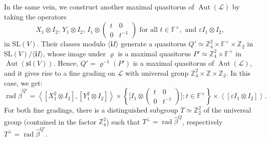 \documentclass[a4paper,reqno]{amsart}
\theoremstyle{definition}
\numberwithin{theorem}{section}
\numberwithin{equation}{section}
\begin{document}
In the same vein, we construct another maximal quasitorus of $\operatorname{\mathrm{Aut}}({\mathcal{L}})$ by taking the operators
\begin{equation*} 
X_1\otimes I_2,\, Y_1\otimes I_2,\, 
I_1\otimes \left(\begin{smallmatrix} t&0\\ 0&t^{-1}\end{smallmatrix}\right)\text{ for all } t\in{\mathbb{F}}^\times,\text{ and }{\varepsilon} I_1\otimes I_2,
\end{equation*}
in ${\mathrm{SL}}(V)$. Their classes modulo $\langle {\mathbf{i}} I\rangle$ generate a quasitorus $Q'\simeq{\mathbb{Z}}_4^2\times{\mathbb{F}}^\times\times{\mathbb{Z}}_2$ in ${\mathrm{SL}}(V)/\langle {\mathbf{i}} I\rangle$, whose image under $\varrho$ is a maximal quasitorus $P'\simeq{\mathbb{Z}}_4^2\times{\mathbb{F}}^\times$ in $\operatorname{\mathrm{Aut}}({{\mathfrak{sl}}}(V))$. Hence, $Q'=\varrho^{-1}(P')$ is a maximal quasitorus of $\operatorname{\mathrm{Aut}}({\mathcal{L}})$, and it gives rise to a fine grading on ${\mathcal{L}}$ with universal group ${\mathbb{Z}}_4^2\times{\mathbb{Z}}\times{\mathbb{Z}}_2$. In this case, we get:
\[
\operatorname{\mathrm{rad}}\hat\beta^{Q'}=\left\langle [X_1^2\otimes I_2],[Y_1^2\otimes I_2]\right\rangle\times
\left\{\bigl[I_1\otimes \left(\begin{smallmatrix} t&0\\ 0&t^{-1}\end{smallmatrix}\right)\bigr]: t\in{\mathbb{F}}^\times\right\}\times
\left\langle [{\varepsilon} I_1\otimes I_2]\right\rangle.
\]
For both fine gradings, there is a distinguished subgroup $T\simeq{\mathbb{Z}}_2^2$ of the universal group (contained in the factor ${\mathbb{Z}}_4^2$) such that $T^\perp=\operatorname{\mathrm{rad}}\hat{\beta}^Q$, respectively $T^\perp=\operatorname{\mathrm{rad}}\hat{\beta}^{Q'}$.

\medskip
\end{document}

